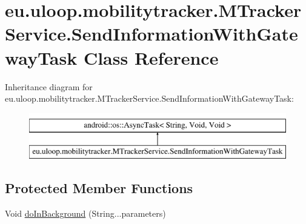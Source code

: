 \hypertarget{classeu_1_1uloop_1_1mobilitytracker_1_1MTrackerService_1_1SendInformationWithGatewayTask}{\section{eu.\+uloop.\+mobilitytracker.\+M\+Tracker\+Service.\+Send\+Information\+With\+Gateway\+Task Class Reference}
\label{classeu_1_1uloop_1_1mobilitytracker_1_1MTrackerService_1_1SendInformationWithGatewayTask}
}
Inheritance diagram for eu.\+uloop.\+mobilitytracker.\+M\+Tracker\+Service.\+Send\+Information\+With\+Gateway\+Task\+:\begin{figure}[H]
\begin{center}
\leavevmode
\includegraphics[height=2.000000cm]{classeu_1_1uloop_1_1mobilitytracker_1_1MTrackerService_1_1SendInformationWithGatewayTask}
\end{center}
\end{figure}
\subsection*{Protected Member Functions}
\begin{DoxyCompactItemize}
\item 
Void \hyperlink{classeu_1_1uloop_1_1mobilitytracker_1_1MTrackerService_1_1SendInformationWithGatewayTask_adbcf100edb442c27fc18e44bce9bb66d}{do\+In\+Background} (String...\+parameters)
\end{DoxyCompactItemize}


